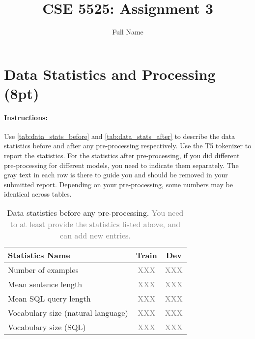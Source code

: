\documentclass{article}
\title{CSE 5525: Assignment 3}
\author{Full Name}
\date{}
\begin{document}
\maketitle


\section{Data Statistics and Processing (8pt)}
\paragraph{Instructions:} Use \autoref{tab:data_stats_before} and \autoref{tab:data_stats_after} to describe the data statistics before and after any pre-processing respectively. 
Use the T5 tokenizer to report the statistics. 
For the statistics after pre-processing, if you did different pre-processing for different models, you need to indicate them separately.
The gray text in each row is there to guide you and should be removed in your submitted report.
Depending on your pre-processing, some numbers may be identical across tables. 

\begin{table}[h!]
\centering
\begin{tabular}{lcc}
\toprule
Statistics Name & Train & Dev \\
\midrule
Number of examples & \textcolor{gray}{XXX} & \textcolor{gray}{XXX} \\
Mean sentence length & \textcolor{gray}{XXX}& \textcolor{gray}{XXX} \\
Mean SQL query length & \textcolor{gray}{XXX}& \textcolor{gray}{XXX}  \\
Vocabulary size (natural language)& \textcolor{gray}{XXX}& \textcolor{gray}{XXX}  \\
Vocabulary size (SQL)& \textcolor{gray}{XXX}& \textcolor{gray}{XXX}  \\
\bottomrule
\end{tabular}
\caption{Data statistics before any pre-processing. \textcolor{gray}{You need to at least provide the statistics listed above, and can add new entries.}}
\label{tab:data_stats_before}
\end{table}
\end{document}
